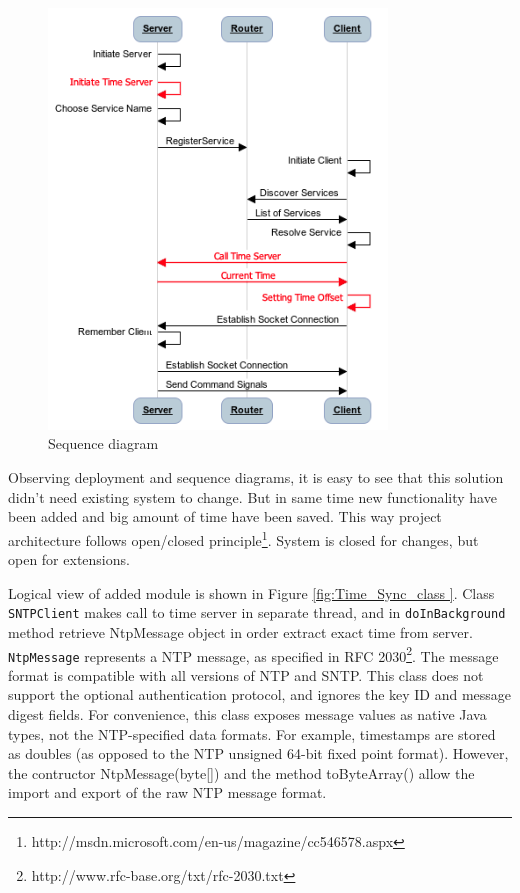 \begin{figure}[H]
	\centering
		\includegraphics[width=9cm]{sprint5/communication}
	\caption{Sequence diagram}
	\label{fig:sprint5_sequence_diagram}
\end{figure}

Observing deployment and sequence diagrams, it is easy to see that this solution didn't need existing system to change. But in same time new functionality have been added and big amount of time have been saved. This way project architecture follows open/closed principle\footnote{http://msdn.microsoft.com/en-us/magazine/cc546578.aspx}. System is closed for changes, but open for extensions.



Logical view of added module is shown in Figure \ref{fig:Time_Sync_class }. Class \texttt{SNTPClient} makes call to time server in separate thread, and in \texttt{doInBackground} method retrieve NtpMessage object in order extract exact time from server. \texttt{NtpMessage} represents a NTP message, as specified in RFC 2030\footnote{http://www.rfc-base.org/txt/rfc-2030.txt}. The message format is compatible with all versions of NTP and SNTP. This class does not support the optional authentication protocol, and ignores the key ID and message digest fields. For convenience, this class exposes message values as native Java types, not the NTP-specified data formats. For example, timestamps are stored as doubles (as opposed to the NTP unsigned 64-bit fixed point format). However, the contructor NtpMessage(byte[]) and the method toByteArray() allow the import and export of the raw NTP message format.



